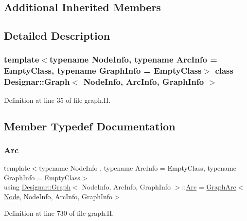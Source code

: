 \subsection*{Additional Inherited Members}


\subsection{Detailed Description}
\subsubsection*{template$<$typename Node\+Info, typename Arc\+Info = Empty\+Class, typename Graph\+Info = Empty\+Class$>$\newline
class Designar\+::\+Graph$<$ Node\+Info, Arc\+Info, Graph\+Info $>$}



Definition at line 35 of file graph.\+H.



\subsection{Member Typedef Documentation}
\mbox{\label{class_designar_1_1_graph_a74c730ef4ce2d20f998d72bd25c2b5bf}} 
\subsubsection{\texorpdfstring{Arc}{Arc}}
{\footnotesize\ttfamily template$<$typename Node\+Info , typename Arc\+Info  = Empty\+Class, typename Graph\+Info  = Empty\+Class$>$ \\
using \hyperlink{class_designar_1_1_graph}{Designar\+::\+Graph}$<$ Node\+Info, Arc\+Info, Graph\+Info $>$\+::\hyperlink{class_designar_1_1_graph_a74c730ef4ce2d20f998d72bd25c2b5bf}{Arc} =  \hyperlink{class_designar_1_1_graph_arc}{Graph\+Arc}$<$\hyperlink{class_designar_1_1_graph_a5dfc7dba9d092ac489c72e40390c37d0}{Node}, Node\+Info, Arc\+Info, Graph\+Info$>$}



Definition at line 730 of file graph.\+H.

\mbox{\label{class_designar_1_1_graph_abc2adb4841a6d092d5093f9e60f2c8be}} 
